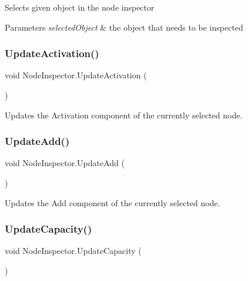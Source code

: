 Selects given object in the node inspector 


\begin{DoxyParams}{Parameters}
{\em selected\+Object} & the object that needs to be inspected \\
\hline
\end{DoxyParams}
\mbox{\label{class_node_inspector_a3886723916c36d8435c4c9c477a97040}} 
\subsubsection{\texorpdfstring{Update\+Activation()}{UpdateActivation()}}
{\footnotesize\ttfamily void Node\+Inspector.\+Update\+Activation (\begin{DoxyParamCaption}{ }\end{DoxyParamCaption})}



Updates the Activation component of the currently selected node. 

\mbox{\label{class_node_inspector_ab378830e6c5353dc122bf5a99a30cb3a}} 
\subsubsection{\texorpdfstring{Update\+Add()}{UpdateAdd()}}
{\footnotesize\ttfamily void Node\+Inspector.\+Update\+Add (\begin{DoxyParamCaption}{ }\end{DoxyParamCaption})}



Updates the Add component of the currently selected node. 

\mbox{\label{class_node_inspector_a5e707e8401204ddfab6e3468b007440f}} 
\subsubsection{\texorpdfstring{Update\+Capacity()}{UpdateCapacity()}}
{\footnotesize\ttfamily void Node\+Inspector.\+Update\+Capacity (\begin{DoxyParamCaption}{ }\end{DoxyParamCaption})}



